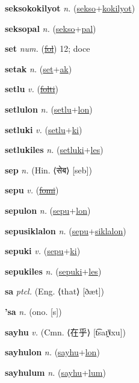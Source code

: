 \textbf{\hypertarget{seksokokilyot}{seksokokilyot}} \textit{n.} (\hyperlink{sekso}{sekso}+\allowbreak \hyperlink{kokilyot}{kokilyot})


\textbf{\hypertarget{seksopal}{seksopal}} \textit{n.} (\hyperlink{sekso}{sekso}+\allowbreak \hyperlink{pal}{pal})


\textbf{\hypertarget{set}{set}} \textit{num.} (\hyperlink{fol}{\sout{fol}})
12; doce

\textbf{\hypertarget{setak}{setak}} \textit{n.} (\hyperlink{set}{set}+\allowbreak \hyperlink{ak}{ak})


\textbf{\hypertarget{setlu}{setlu}} \textit{v.} (\hyperlink{folti}{\sout{folti}})


\textbf{\hypertarget{setlulon}{setlulon}} \textit{n.} (\hyperlink{setlu}{setlu}+\allowbreak \hyperlink{lon}{lon})


\textbf{\hypertarget{setluki}{setluki}} \textit{v.} (\hyperlink{setlu}{setlu}+\allowbreak \hyperlink{ki}{ki})


\textbf{\hypertarget{setlukiles}{setlukiles}} \textit{n.} (\hyperlink{setluki}{setluki}+\allowbreak \hyperlink{les}{les})


\textbf{\hypertarget{sep}{sep}} \textit{n.} (Hin. ⟨{\devanagari{}सेब}⟩ [seb])


\textbf{\hypertarget{sepu}{sepu}} \textit{v.} (\hyperlink{fomi}{\sout{fomi}})


\textbf{\hypertarget{sepulon}{sepulon}} \textit{n.} (\hyperlink{sepu}{sepu}+\allowbreak \hyperlink{lon}{lon})


\textbf{\hypertarget{sepusiklalon}{sepusiklalon}} \textit{n.} (\hyperlink{sepu}{sepu}+\allowbreak \hyperlink{siklalon}{siklalon})


\textbf{\hypertarget{sepuki}{sepuki}} \textit{v.} (\hyperlink{sepu}{sepu}+\allowbreak \hyperlink{ki}{ki})


\textbf{\hypertarget{sepukiles}{sepukiles}} \textit{n.} (\hyperlink{sepuki}{sepuki}+\allowbreak \hyperlink{les}{les})


\textbf{\hypertarget{sa}{sa}} \textit{ptcl.} (Eng. ⟨that⟩ [ðæt])


\textbf{\hypertarget{'sa}{'sa}} \textit{n.} (ono. [s])


\textbf{\hypertarget{sayhu}{sayhu}} \textit{v.} (Cmn. ⟨{\chinese{}在乎}⟩ [t͡saɪ̯˥˩xu])


\textbf{\hypertarget{sayhulon}{sayhulon}} \textit{n.} (\hyperlink{sayhu}{sayhu}+\allowbreak \hyperlink{lon}{lon})


\textbf{\hypertarget{sayhulum}{sayhulum}} \textit{n.} (\hyperlink{sayhu}{sayhu}+\allowbreak \hyperlink{lum}{lum})


